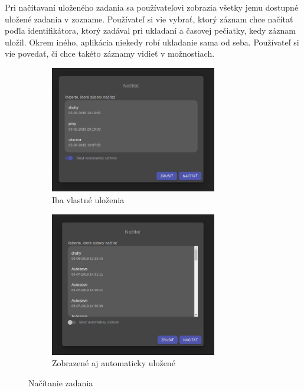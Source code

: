 Pri načítavaní uloženého zadania sa používateľovi zobrazia všetky jemu dostupné uložené zadania v 
zozname. Používateľ si vie vybrať, ktorý záznam chce načítať poďla identifikátora, ktorý zadával
pri ukladaní a časovej pečiatky, kedy záznam uložil. Okrem iného, aplikácia niekedy robí ukladanie
sama od seba. Používateľ si vie povedať, či chce takéto záznamy vidieť v možnostiach.
\begin{figure}[H]
\centering
\begin{subfigure}{.5\textwidth}
  \centering
  \includegraphics[width=0.8\textwidth]{images/nacitaj_zadanie}
  \caption[Iba vlastné uloženia]{Iba vlastné uloženia}
  \label{obr:nacitaj_zadanie}
\end{subfigure}%
\begin{subfigure}{.5\textwidth}
  \centering
  \includegraphics[width=0.8\textwidth]{images/nacitaj_automaticky_ulozene}
  \caption[Zobrazené aj automaticky uložené]{Zobrazené aj automaticky uložené}
  \label{obr:platny_nazov}
\end{subfigure}
\caption{Načítanie zadania}
\end{figure}

